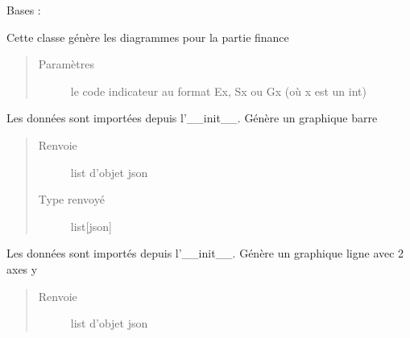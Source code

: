 \documentclass[letterpaper,10pt,french]{sphinxmanual}
\begin{document}
\begin{fulllineitems}
\label{\detokenize{app.home.content_gen:app.home.content_gen.graph_generation.FinancialChart}}
\sphinxAtStartPar
Bases : 

\sphinxAtStartPar
Cette classe génère les diagrammes pour la partie finance
\begin{quote}\begin{description}
\item[{Paramètres}] \leavevmode
\sphinxAtStartPar
{} \textendash{} 
\sphinxAtStartPar
le code indicateur au format Ex, Sx ou Gx (où x est un int)


\end{description}\end{quote}

\begin{fulllineitems}
\label{\detokenize{app.home.content_gen:app.home.content_gen.graph_generation.FinancialChart.plot_bar}}
\sphinxAtStartPar
Les données sont importées depuis l’\_\_init\_\_. Génère un graphique barre
\begin{quote}\begin{description}
\item[{Renvoie}] \leavevmode
\sphinxAtStartPar
list d’objet json

\item[{Type renvoyé}] \leavevmode
\sphinxAtStartPar
list{[}json{]}

\end{description}\end{quote}

\end{fulllineitems}


\begin{fulllineitems}
\label{\detokenize{app.home.content_gen:app.home.content_gen.graph_generation.FinancialChart.plot_mltpl_line}}
\sphinxAtStartPar
Les données sont importés depuis l’\_\_init\_\_. Génère un graphique ligne avec 2 axes y
\begin{quote}\begin{description}
\item[{Renvoie}] \leavevmode
\sphinxAtStartPar
list d’objet json


\end{description}
\end{quote}
\end{fulllineitems}
\end{fulllineitems}
\end{document}

